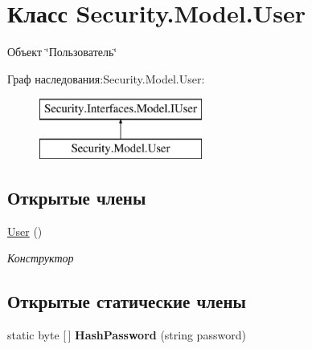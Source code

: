 \hypertarget{class_security_1_1_model_1_1_user}{}\section{Класс Security.\+Model.\+User}
\label{class_security_1_1_model_1_1_user}


Объект \char`\"{}Пользователь\char`\"{}  


Граф наследования\+:Security.\+Model.\+User\+:\begin{figure}[H]
\begin{center}
\leavevmode
\includegraphics[height=2.000000cm]{d9/dcb/class_security_1_1_model_1_1_user}
\end{center}
\end{figure}
\subsection*{Открытые члены}
\begin{DoxyCompactItemize}
\item 
\hyperlink{class_security_1_1_model_1_1_user_aa5563e8da86aa9317bcc06963d4ed783}{User} ()
\begin{DoxyCompactList}\small\item\em Конструктор \end{DoxyCompactList}\end{DoxyCompactItemize}
\subsection*{Открытые статические члены}
\begin{DoxyCompactItemize}
\item 
\mbox{\label{class_security_1_1_model_1_1_user_a810216c85eaba467732adc1f22db5f50}} 
static byte \mbox{[}$\,$\mbox{]} {\bfseries Hash\+Password} (string password)
\end{DoxyCompactItemize}
